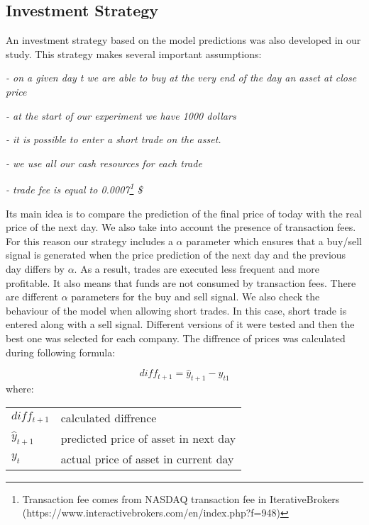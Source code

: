 \documentclass[11pt]{article} %
\makeatletter
\newenvironment{conditions}
  {\par\vspace{\abovedisplayskip}\noindent\begin{tabular}{>{$}l<{$} @{${}={}$} l}}
  {\end{tabular}\par\vspace{\belowdisplayskip}}
\makeatother
\begin{document}
\subsection{Investment Strategy}

An investment strategy based on the model predictions was also developed in our study. This strategy makes several important assumptions: 
 \begin{flushleft}\textit{- on a given day t we are able to buy at the very end of the day an asset at close price} \end{flushleft}
 \begin{flushleft}\textit{- at the start of our experiment we have 1000 dollars}  \end{flushleft}
 \begin{flushleft}\textit{- it is possible to enter a short trade on the asset.} \end{flushleft}
\begin{flushleft}\textit{- we use all our cash resources for each trade } \end{flushleft}
\begin{flushleft}\textit{- trade fee is equal to 0.0007\footnote{Transaction fee comes from NASDAQ transaction fee in IterativeBrokers (https://www.interactivebrokers.com/en/index.php?f=948)} \$ } \end{flushleft}

Its main idea is to compare the prediction of the final price of today with the real price of the next day. We also take into account the presence of transaction fees. For this reason our strategy includes a $\alpha$ parameter which ensures that a buy/sell signal is generated when the price prediction of the next day and the previous day differs by $\alpha$. As a result, trades are executed less frequent and more profitable. It also means that funds are not consumed by transaction fees. There are different $\alpha$ parameters for the buy and sell signal. We also check the behaviour of the model when allowing short trades. In this case, short trade is entered along with a sell signal. 
Different versions of it were tested and then the best one was selected for each company.
The diffrence of prices was calculated during following formula:

\begin{equation}  diff_{t+1} = \hat{y}_{t+1} - y_{t1} \end{equation}
where:
\begin{conditions}
diff_{t+1} & calculated diffrence \\ 
 \hat{y}_{t+1}     &   predicted price of asset in next day\\
 y_{t}     &  actual price of asset in current day\\   
\end{conditions}
\end{document}
